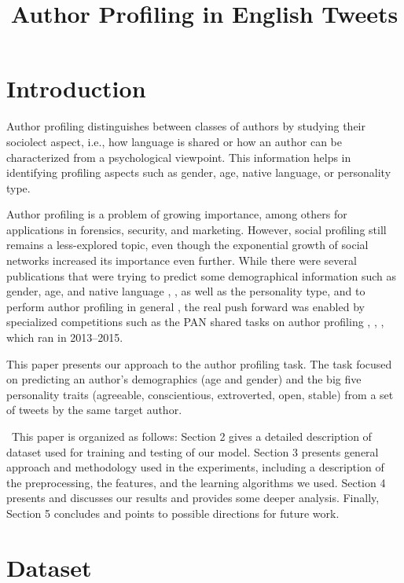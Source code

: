 \documentclass[10pt, a4paper]{article}
\title{ Author Profiling in English Tweets}
\begin{document}
\maketitleabstract

\section{Introduction}

Author profiling distinguishes between classes of authors by studying their sociolect aspect, i.e., how language is shared or how an author can be characterized from a psychological viewpoint. This information helps in identifying profiling aspects such as gender, age, native language, or personality type. 
\par
Author profiling is a problem of growing importance, among others for applications in forensics, security, and marketing. However, social profiling still remains a less-explored topic, even though the exponential growth of social networks increased its importance even further. While there were several publications that were trying to predict some demographical information such as gender, age, and native language \citep{argamon2003}, \citep{peersman2011}, as well as the personality type, and to perform author profiling in general \citep{argamon2009}, the real push forward was enabled by specialized competitions such as the PAN shared tasks on author profiling \citep{pardo2013}, \citep{rangel2014}, \citep{rangel2015}, which ran in 2013–2015. 
\par
This paper presents our approach to the author profiling task. The task focused on predicting an author’s demographics (age and gender) and the big five personality traits \citep{mccrae2008} (agreeable, conscientious, extroverted, open, stable) from a set of tweets by the same target author.
\par\
This paper is organized as follows: Section 2
gives a detailed description of dataset used for
training and testing of our model. Section 3
presents general approach and methodology used
in the experiments, including a description of the
preprocessing, the features, and the learning
algorithms we used. Section 4 presents and
discusses our results and provides some deeper
analysis. Finally, Section 5 concludes and points
to possible directions for future work.

\section{Dataset}
\end{document}
